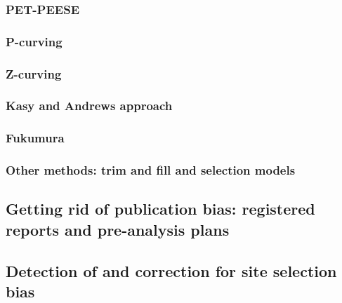 \documentclass[]{book}
\theoremstyle{definition}
\theoremstyle{definition}
\theoremstyle{definition}
\theoremstyle{remark}
\begin{document}
\hypertarget{pet-peese}{%
\subsubsection{PET-PEESE}\label{pet-peese}}

\hypertarget{p-curving}{%
\subsubsection{P-curving}\label{p-curving}}

\hypertarget{z-curving}{%
\subsubsection{Z-curving}\label{z-curving}}

\hypertarget{kasy-and-andrews-approach}{%
\subsubsection{Kasy and Andrews approach}\label{kasy-and-andrews-approach}}

\hypertarget{fukumura}{%
\subsubsection{Fukumura}\label{fukumura}}

\hypertarget{other-methods-trim-and-fill-and-selection-models}{%
\subsubsection{Other methods: trim and fill and selection models}\label{other-methods-trim-and-fill-and-selection-models}}

\hypertarget{getting-rid-of-publication-bias-registered-reports-and-pre-analysis-plans}{%
\subsection{Getting rid of publication bias: registered reports and pre-analysis plans}\label{getting-rid-of-publication-bias-registered-reports-and-pre-analysis-plans}}

\hypertarget{detection-of-and-correction-for-site-selection-bias}{%
\subsection{Detection of and correction for site selection bias}\label{detection-of-and-correction-for-site-selection-bias}}
\end{document}
